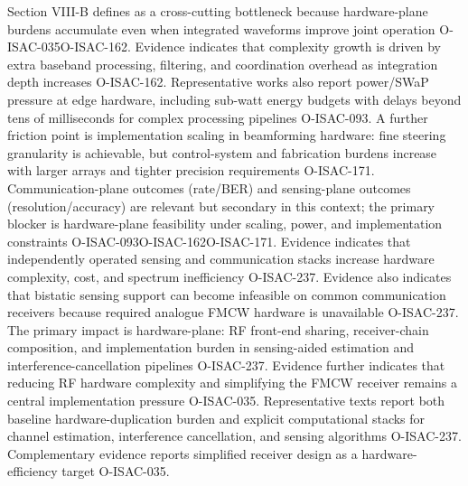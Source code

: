 {}Section VIII-B defines  as a cross-cutting bottleneck because hardware-plane burdens accumulate even when integrated waveforms improve joint operation O-ISAC-035O-ISAC-162. Evidence indicates that complexity growth is driven by extra baseband processing, filtering, and coordination overhead as integration depth increases O-ISAC-162. Representative works also report power/SWaP pressure at edge hardware, including sub-watt energy budgets with delays beyond tens of milliseconds for complex processing pipelines O-ISAC-093. A further friction point is implementation scaling in beamforming hardware: fine steering granularity is achievable, but control-system and fabrication burdens increase with larger arrays and tighter precision requirements O-ISAC-171. Communication-plane outcomes (rate/BER) and sensing-plane outcomes (resolution/accuracy) are relevant but secondary in this context; the primary blocker is hardware-plane feasibility under scaling, power, and implementation constraints O-ISAC-093O-ISAC-162O-ISAC-171.\markdownRendererInterblockSeparator
{}
\markdownRendererSectionEnd \markdownRendererSectionBegin
{}\markdownRendererInterblockSeparator
{}\markdownRendererOlBegin
{} Evidence indicates that independently operated sensing and communication stacks increase hardware complexity, cost, and spectrum inefficiency O-ISAC-237. Evidence also indicates that bistatic sensing support can become infeasible on common communication receivers because required analogue FMCW hardware is unavailable O-ISAC-237.\markdownRendererOlItemEnd 
{} The primary impact is hardware-plane: RF front-end sharing, receiver-chain composition, and implementation burden in sensing-aided estimation and interference-cancellation pipelines O-ISAC-237. Evidence further indicates that reducing RF hardware complexity and simplifying the FMCW receiver remains a central implementation pressure O-ISAC-035.\markdownRendererOlItemEnd 
{} Representative texts report both baseline hardware-duplication burden and explicit computational stacks for channel estimation, interference cancellation, and sensing algorithms O-ISAC-237. Complementary evidence reports simplified receiver design as a hardware-efficiency target O-ISAC-035.\markdownRendererOlItemEnd 
